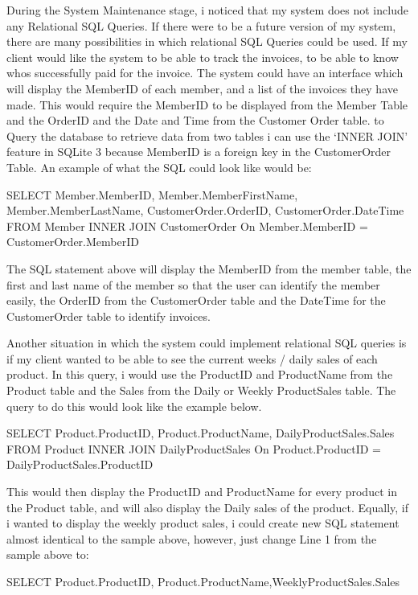 During the System Maintenance stage, i noticed that my system does not include any Relational SQL Queries. If there were to be a future version of my system, there are many possibilities in which relational SQL Queries could be used. If my client would like the system to be able to track the invoices, to be able to know whos successfully paid for the invoice. The system could have an interface which will display the MemberID of each member, and a list of the invoices they have made. This would require the MemberID to be displayed from the Member Table and the OrderID and the Date and Time from the Customer Order table. to Query the database to retrieve data from two tables i can use the `INNER JOIN' feature in SQLite 3 because MemberID is a foreign key in the CustomerOrder Table. An example of what the SQL could look like would be:
\begin{sql}
SELECT Member.MemberID, Member.MemberFirstName, Member.MemberLastName, CustomerOrder.OrderID, CustomerOrder.DateTime
FROM Member
INNER JOIN CustomerOrder
On Member.MemberID = CustomerOrder.MemberID
\end{sql}

The SQL statement above will display the MemberID from the member table, the first and last name of the member so that the user can identify the member easily, the OrderID from the CustomerOrder table and the DateTime for the CustomerOrder table to identify invoices.

Another situation in which the system could implement relational SQL queries is if my client wanted to be able to see the current weeks / daily sales of each product. In this query, i would use the ProductID and ProductName from the Product table and the Sales from the Daily or Weekly ProductSales table. The query to do this would look like the example below.
\begin{sql}
SELECT Product.ProductID, Product.ProductName, DailyProductSales.Sales
FROM Product
INNER JOIN DailyProductSales
On Product.ProductID = DailyProductSales.ProductID
\end{sql}

This would then display the ProductID and ProductName for every product in the Product table, and will also display the Daily sales of the product. Equally, if i wanted to display the weekly product sales, i could create new SQL statement almost identical to the sample above, however, just change Line 1 from the sample above to:

\begin{sql}
SELECT Product.ProductID, Product.ProductName,WeeklyProductSales.Sales
\end{sql}

